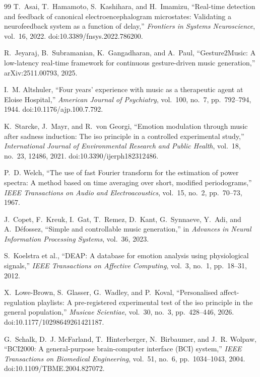 \documentclass[11pt,a4paper]{article}
\begin{document}
\begin{thebibliography}{99}
T.~Asai, T.~Hamamoto, S.~Kashihara, and H.~Imamizu, ``Real-time detection and feedback of
canonical electroencephalogram microstates: Validating a neurofeedback system as a function
of delay,'' \emph{Frontiers in Systems Neuroscience}, vol.~16, 2022.
doi:10.3389/fnsys.2022.786200.

R.~Jeyaraj, B.~Subramanian, K.~Gangadharan, and A.~Paul, ``Gesture2Music: A low-latency
real-time framework for continuous gesture-driven music generation,'' arXiv:2511.00793,
2025.

I.~M. Altshuler, ``Four years' experience with music as a therapeutic agent at Eloise
Hospital,'' \emph{American Journal of Psychiatry}, vol.~100, no.~7, pp.~792--794, 1944.
doi:10.1176/ajp.100.7.792.

K.~Starcke, J.~Mayr, and R.~von Georgi, ``Emotion modulation through music after sadness
induction: The iso principle in a controlled experimental study,'' \emph{International
Journal of Environmental Research and Public Health}, vol.~18, no.~23, 12486, 2021.
doi:10.3390/ijerph182312486.

P.~D. Welch, ``The use of fast Fourier transform for the estimation of power spectra: A
method based on time averaging over short, modified periodograms,'' \emph{IEEE Transactions
on Audio and Electroacoustics}, vol.~15, no.~2, pp.~70--73, 1967.

J.~Copet, F.~Kreuk, I.~Gat, T.~Remez, D.~Kant, G.~Synnaeve, Y.~Adi, and A.~D\'efossez,
``Simple and controllable music generation,'' in \emph{Advances in Neural Information
Processing Systems}, vol.~36, 2023.

S.~Koelstra et al., ``DEAP: A database for emotion analysis using physiological signals,''
\emph{IEEE Transactions on Affective Computing}, vol.~3, no.~1, pp.~18--31, 2012.

X.~Lowe-Brown, S.~Glasser, G.~Wadley, and P.~Koval, ``Personalised affect-regulation
playlists: A pre-registered experimental test of the iso principle in the general
population,'' \emph{Musicae Scientiae}, vol.~30, no.~3, pp.~428--446, 2026.
doi:10.1177/10298649261421187.

G.~Schalk, D.~J. McFarland, T.~Hinterberger, N.~Birbaumer, and J.~R. Wolpaw, ``BCI2000: A
general-purpose brain-computer interface (BCI) system,'' \emph{IEEE Transactions on
Biomedical Engineering}, vol.~51, no.~6, pp.~1034--1043, 2004.
doi:10.1109/TBME.2004.827072.


\end{thebibliography}
\end{document}
